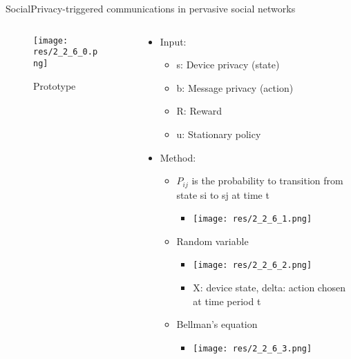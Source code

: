 \begin{frame}{Social}{Privacy-triggered communications in pervasive social networks \cite{jadliwala_privacytriggered_2011}}

	\begin{columns}
		\begin{column}{0.4\textwidth}
			\begin{center}
			
				\begin{figure}
					\texttt{[image: res/2\_2\_6\_0.png]}
					\caption{\label{fig:2_2_6_0} Prototype}
				\end{figure}
				
			\end{center}
		\end{column}
		
		\begin{column}{0.6\textwidth}
		
			\begin{itemize}
			
				\item Input:
					\begin{itemize}
						\item s: Device privacy (state)
						\item b: Message privacy (action)
						\item R: Reward
						\item u: Stationary policy 
					\end{itemize}
					
				\item Method:
					\begin{itemize}
						\item $P_{ij}$ is the probability to transition from state si to sj at time t
							\begin{itemize}
								\item[] \texttt{[image: res/2\_2\_6\_1.png]}
							\end{itemize}
							
						
						\item Random variable
							\begin{itemize}
								\item[] \texttt{[image: res/2\_2\_6\_2.png]}
								\item X: device state, delta: action chosen at time period t
							\end{itemize}
							
						\item Bellman’s equation
							\begin{itemize}
								\item[] \texttt{[image: res/2\_2\_6\_3.png]}
							\end{itemize}
							

\end{itemize}
\end{itemize}
\end{column}
\end{columns}
\end{frame}
